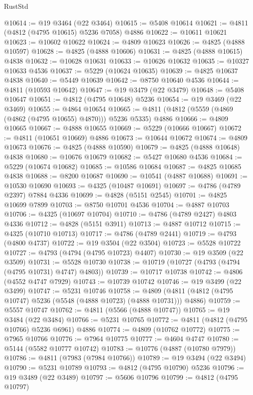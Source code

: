\begin{lexlean}{RustStd}
\begin{coremodule}
{\begin{coremodule}
{{{{{{{{{{{{{{{{{{{{{{{{{{{{{{{{{{{{{{{{{{{{{{{{{{{{{{{{{{{{{{{{{{{{{{{{{{{{{{{{@10614 := @19 @3464 (@22 @3464)
@10615 := @5408 @10614
@10621 := @4811 (@4812 (@4795 @10615) @5236 @7058) @4886
@10622 := @10611 @10621
@10623 := @10602 @10622
@10624 := @4809 @10623
@10626 := @4825 (@4888 @10597)
@10628 := @4825 (@4888 @10606)
@10631 := @4825 (@4888 @10615) @4838
@10632 := @10628 @10631
@10633 := @10626 @10632
@10635 := @10327 @10633 @4536
@10637 := @5229 (@10624 @10635)
@10639 := @4825 @10637 @4838
@10640 := @5449 @10639
@10642 := @8750 @10640 @4536
@10644 := @4811 (@10593 @10642)
@10647 := @19 @3479 (@22 @3479)
@10648 := @5408 @10647
@10651 := @4812 (@4795 @10648) @5236
@10654 := @19 @3469 (@22 @3469)
@10655 := @4864 @10654
@10665 := @4811 (@4812 (@5559 (@4869 (@4862 (@4795 @10655) @4870))) @5236 @5335) @4886
@10666 := @4809 @10665
@10667 := @4888 @10655
@10669 := @5229 (@10666 @10667)
@10672 := @4811 (@10651 @10669) @4886
@10673 := @10644 @10672
@10674 := @4809 @10673
@10676 := @4825 (@4888 @10590)
@10679 := @4825 (@4888 @10648) @4838
@10680 := @10676 @10679
@10682 := @5427 @10680 @4536
@10684 := @5229 (@10674 @10682)
@10685 := @10586 @10684
@10687 := @4825 @10685 @4838
@10688 := @8200 @10687
@10690 := @10541 (@4887 @10688)
@10691 := @10530 @10690
@10693 := @4325 (@10487 @10691)
@10697 := @4786 (@4789 @2397) @7884 @4336
@10699 := @4828 (@5151 @2545)
@10701 := @4825 @10699 @7899
@10703 := @8750 @10701 @4536
@10704 := @4887 @10703
@10706 := @4325 (@10697 @10704)
@10710 := @4786 (@4789 @2427) @4803 @4336
@10712 := @4828 (@5151 @3911)
@10713 := @4887 @10712
@10715 := @4325 (@10710 @10713)
@10717 := @4786 (@4789 @2441)
@10719 := @4793 (@4800 @4737)
@10722 := @19 @3504 (@22 @3504)
@10723 := @5528 @10722
@10727 := @4793 (@4794 (@4795 @10723) @4407)
@10730 := @19 @3509 (@22 @3509)
@10731 := @5528 @10730
@10738 := @10719 (@10727 (@4793 (@4794 (@4795 @10731) @4747) @4803))
@10739 := @10717 @10738
@10742 := @4806 (@4552 @4747 @7929)
@10743 := @10739 @10742
@10746 := @19 @3499 (@22 @3499)
@10747 := @5231 @10746
@10758 := @4809 (@4811 (@4812 (@4795 @10747) @5236 (@5548 (@4888 @10723) (@4888 @10731))) @4886)
@10759 := @5557 @10747
@10762 := @4811 (@5566 (@4888 @10747))
@10765 := @19 @3484 (@22 @3484)
@10766 := @5231 @10765
@10772 := @4811 (@4812 (@4795 @10766) @5236 @6961) @4886
@10774 := @4809 (@10762 @10772)
@10775 := @7965 @10766
@10776 := @7964 @10775
@10777 := @4604 @4747
@10780 := @5144 (@5582 @10777 @10742)
@10783 := @10776 (@4887 (@10780 @7979))
@10786 := @4811 (@7983 (@7984 @10766))
@10789 := @19 @3494 (@22 @3494)
@10790 := @5231 @10789
@10793 := @4812 (@4795 @10790) @5236
@10796 := @19 @3489 (@22 @3489)
@10797 := @5606 @10796
@10799 := @4812 (@4795 @10797)
}}}}}}}}}}}}}}}}}}}}}}}}}}}}}}}}}}}}}}}}}}}}}}}}}}}}}}}}}}}}}}}}}}}}}}}}}}}}}}}}
\end{coremodule}}
\end{coremodule}
\end{lexlean}
